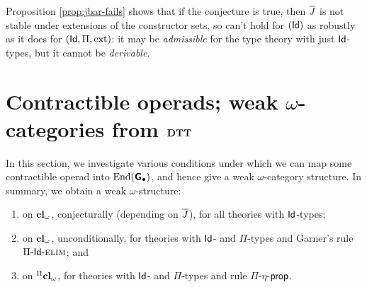 \documentclass{amsart}
\newcommand{\ext}{\mathrm{ext}}
\begin{document}
Proposition \ref{prop:jbar-fails} shows that if the conjecture is true, then $\overline{J}$ is not stable under extensions of the constructor sets, so can't hold for $(\mathsf{Id})$ as robustly as it does for $(\Id,\Pi,\ext)$: it may be \emph{admissible} for the type theory with just $\mathsf{Id}$-types, but it cannot be \emph{derivable}. \\





























\section{Contractible operads; weak $\omega$-categories from $\mathbf{DTT}$} \label{sec:contractibility}



 In this section, we investigate various conditions under which we can map some contractible operad into $\mathrm{End}(\textsf{\textbf{G}}_\bullet)$, and hence give a weak $\omega$-category structure.  In summary, we obtain a weak $\omega$-structure:
\begin{enumerate}
\item on $\mathbf{cl}_\omega$, conjecturally (depending on $\overline{J}$), for all theories with $\mathsf{Id}$-types;
\item on $\mathbf{cl}_\omega$, unconditionally, for theories with $\mathsf{Id}$- and $\Pi$-types and Garner's rule ${\Pi\mbox{-}\mathsf{Id}\mbox{-}\textsc{elim}}$; and
\item on ${}^\Pi \mathbf{cl}_\omega$, for theories with $\mathsf{Id}$- and $\Pi$-types and rule $\Pi$-$\eta$-$\mathsf{prop}$.
\end{enumerate}
\end{document}
